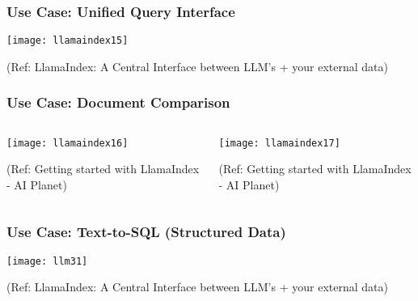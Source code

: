 \begin{frame}[fragile]\frametitle{Use Case: Unified Query Interface}

\begin{center}
\texttt{[image: llamaindex15]}

{\tiny (Ref: LlamaIndex: A Central Interface between LLM’s + your external data)}
\end{center}
\end{frame}

\begin{frame}[fragile]\frametitle{Use Case: Document Comparison}

\begin{columns}
    \begin{column}[T]{0.45\linewidth}

		\begin{center}
		\texttt{[image: llamaindex16]}

		{\tiny (Ref: Getting started with LlamaIndex - AI Planet)}
		\end{center}
		
    \end{column}
    \begin{column}[T]{0.45\linewidth}
		\begin{center}
		\texttt{[image: llamaindex17]}

		{\tiny (Ref: Getting started with LlamaIndex - AI Planet)}
		\end{center}
    \end{column}
  \end{columns}
  
  


\end{frame}



\begin{frame}[fragile]\frametitle{Use Case: Text-to-SQL (Structured Data)}

\begin{center}
\texttt{[image: llm31]}

{\tiny (Ref: LlamaIndex: A Central Interface between LLM’s + your external data)}
\end{center}
\end{frame}

